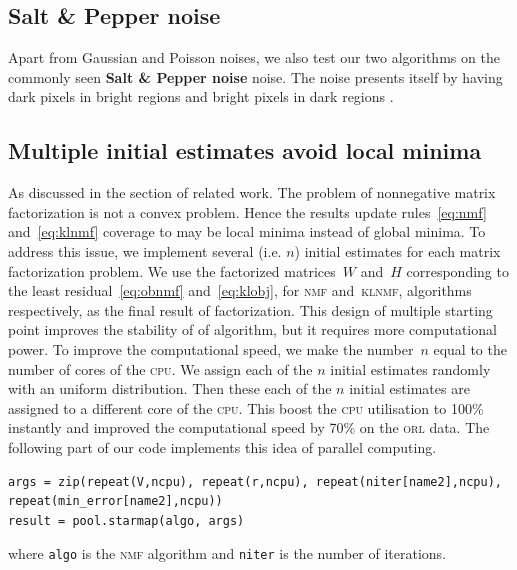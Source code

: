 \subsection{Salt \& Pepper noise}
Apart from Gaussian and Poisson noises, we also test our two algorithms on the commonly seen \textbf{Salt \& Pepper noise} noise. The noise presents itself by having dark pixels in bright regions and bright pixels in dark regions \citep{sampat2005computer}.

\subsection{Multiple initial estimates avoid local minima}
As discussed in the section of related work.
The problem of nonnegative matrix factorization is not a convex problem.
Hence the results update rules~\eqref{eq:nmf} and~\eqref{eq:klnmf} coverage to may be local minima instead of global minima.
To address this issue, we implement several (i.e. $n$) initial estimates for each matrix factorization problem.
We use the factorized matrices~$W$ and~$H$ corresponding to the least residual~\eqref{eq:obnmf} and~\eqref{eq:klobj}, for \textsc{nmf} and~\textsc{klnmf}, algorithms respectively, as the final result of factorization.
This design of multiple starting point improves the stability of of algorithm, but it requires more computational power. To improve the computational speed, we make the number~$n$ equal to the number of cores of the \textsc{cpu}. We assign each of the $n$ initial estimates randomly with an uniform distribution. Then these each of the $n$ initial estimates are assigned to a different core of the \textsc{cpu}. This boost the \textsc{cpu} utilisation to 100\% instantly and improved the computational speed by 70\% on the \textsc{orl} data. The following part of our code implements this idea of parallel computing.
\begin{lstlisting}[caption=Centring image data, label=matn1]
args = zip(repeat(V,ncpu), repeat(r,ncpu), repeat(niter[name2],ncpu), repeat(min_error[name2],ncpu))
result = pool.starmap(algo, args)
\end{lstlisting}
where \texttt{algo} is the \textsc{nmf} algorithm and \texttt{niter} is the number of iterations.


